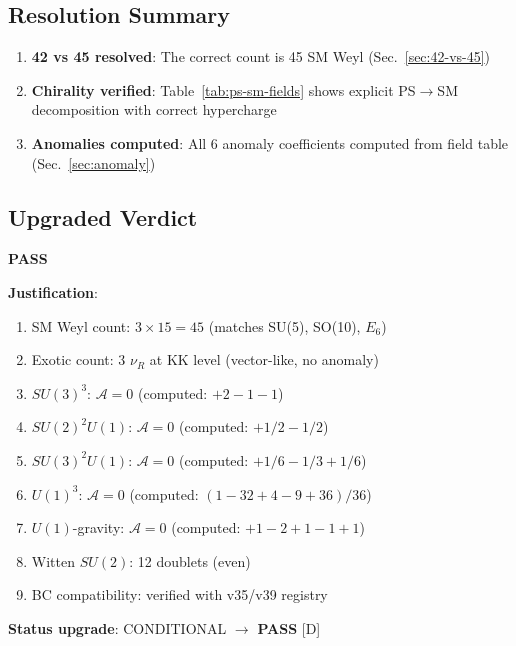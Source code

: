 \documentclass[11pt,a4paper]{article}
\newcommand{\tagD}{\textcolor{blue!70!black}{[D]}}
\begin{document}
\subsection{Resolution Summary}

\begin{enumerate}
    \item \textbf{42 vs 45 resolved}: The correct count is 45 SM Weyl (Sec.~\ref{sec:42-vs-45})
    \item \textbf{Chirality verified}: Table~\ref{tab:ps-sm-fields} shows explicit PS$\to$SM decomposition with correct hypercharge
    \item \textbf{Anomalies computed}: All 6 anomaly coefficients computed from field table (Sec.~\ref{sec:anomaly})
\end{enumerate}

\subsection{Upgraded Verdict}

\begin{verdictbox}
\begin{center}
\Large\textbf{PASS}
\end{center}

\textbf{Justification}:
\begin{enumerate}
    \item SM Weyl count: $3 \times 15 = 45$ (matches SU(5), SO(10), $E_6$)
    \item Exotic count: 3 $\nu_R$ at KK level (vector-like, no anomaly)
    \item $SU(3)^3$: $\mathcal{A} = 0$ (computed: $+2-1-1$)
    \item $SU(2)^2 U(1)$: $\mathcal{A} = 0$ (computed: $+1/2-1/2$)
    \item $SU(3)^2 U(1)$: $\mathcal{A} = 0$ (computed: $+1/6-1/3+1/6$)
    \item $U(1)^3$: $\mathcal{A} = 0$ (computed: $(1-32+4-9+36)/36$)
    \item $U(1)$-gravity: $\mathcal{A} = 0$ (computed: $+1-2+1-1+1$)
    \item Witten $SU(2)$: 12 doublets (even)
    \item BC compatibility: verified with v35/v39 registry
\end{enumerate}

\textbf{Status upgrade}: CONDITIONAL $\to$ \textcolor{green!60!black}{\textbf{PASS}}
\tagD
\end{verdictbox}
\end{document}
